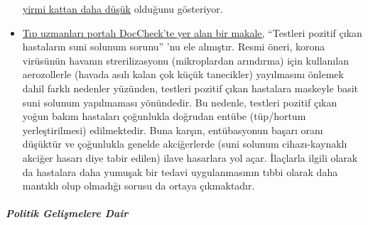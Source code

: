 \begin{itemize}
  \href{https://www.nytimes.com/2020/03/27/nyregion/new-rochelle-coronavirus.html}{yirmi
  kattan daha düşük} olduğunu gösteriyor.
\item
  \href{https://www.doccheck.com/de/detail/articles/26271-covid-19-beatmung-und-dann}{Tıp
  uzmanları portalı DocCheck'te yer alan bir makale,} ``Testleri pozitif
  çıkan hastaların suni solunum sorunu'' 'nu ele almıştır. Resmi öneri,
  korona virüsünün havanın strerilizasyonu (mikroplardan arındırma) için
  kullanılan aerozollerle (havada asılı kalan çok küçük tanecikler)
  yayılmasını önlemek dahil farklı nedenler yüzünden, testleri pozitif
  çıkan hastalara maskeyle basit suni solunum yapılmaması yönündedir. Bu
  nedenle, testleri pozitif çıkan yoğun bakım hastaları çoğunlukla
  doğrudan entübe (tüp/hortum yerleştirilmesi) edilmektedir. Buna
  karşın, entübasyonun başarı oranı düşüktür ve çoğunlukla genelde
  akciğerlerde (suni solunum cihazı-kaynaklı akciğer hasarı diye tabir
  edilen) ilave hasarlara yol açar. İlaçlarla ilgili olarak da hastalara
  daha yumuşak bir tedavi uygulanmasının tıbbi olarak daha mantıklı olup
  olmadığı sorusu da ortaya çıkmaktadır.
\end{itemize}

\hypertarget{politik-geliux15fmelere-dair}{%
\subparagraph{\texorpdfstring{\textbf{Politik Gelişmelere
Dair}}{Politik Gelişmelere Dair}}\label{politik-geliux15fmelere-dair}}

